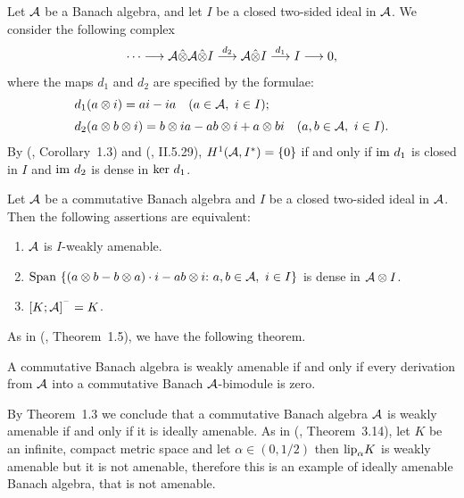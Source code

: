 \documentclass[fleqn]{mat01}
\begin{document}
Let $\cal A$ be a Banach algebra, and let $I$ be a closed two-sided
ideal in $\cal A$. We consider the following complex
\begin{equation*}
\cdots \longrightarrow {\cal A}\hat\otimes{\cal A}\hat\otimes
I\stackrel{d_2 }{\longrightarrow} {\cal A}\hat\otimes I \stackrel
{d_1}{\longrightarrow} I \longrightarrow 0,
\end{equation*}
where the maps $d_1$ and $d_2$ are specified by the formulae:
\begin{align*}
&d_1(a\otimes i)=ai-ia\quad (a\in {\cal A}, \ i\in I);\\[.2pc]
&d_2(a\otimes b\otimes i)=b\otimes ia -ab\otimes i +a\otimes bi \
\ \ (a,b\in {\cal A} , \ i\in I).
\end{align*}
By (\cite{Jo1}, Corollary~1.3) and (\cite{Kh}, II.5.29), $H^1({\cal
A},I^*)=\{0\}$ if and only if ${\rm im}\ d_1$ is closed in $I$ and ${\rm
im}\ d_2$ is dense in ${\rm ker}\ d_1$.

\begin{theor}[\!]
Let $\cal A$ be a commutative Banach algebra and $I$ be a closed
two-sided ideal in $\cal A$. Then the following assertions are
equivalent{\rm :}
\begin{enumerate}
\renewcommand\labelenumi{\rm (\roman{enumi})}
\leftskip .35pc
\item $\cal A$ is $I$-weakly amenable.

\item ${\rm Span}\ \{(a\otimes b-b\otimes a)\cdot i-ab\otimes i{\rm :}\
a,b\in {\cal A},\ i\in I\}$ is dense in ${\cal A}\otimes I$.

\item $[K;{\cal A}]^{^-}=K$.\vspace{-1pc}
\end{enumerate}
\end{theor}

As in (\cite{B-C-D}, Theorem~1.5), we have the following theorem.


\begin{theor}[\!]
A commutative Banach algebra is weakly amenable if and only if every
derivation from $\cal A$ into a commutative Banach $\cal A$-bimodule is
zero.
\end{theor}

By Theorem~1.3 we conclude that a commutative Banach algebra $\cal A$ is
weakly amenable if and only if it is ideally amenable. As in
(\cite{B-C-D}, Theorem~3.14), let $K$ be an infinite, compact metric
space and let $\alpha\in (0,1/2)$ then ${\rm lip}_\alpha K$ is weakly
amenable but it is not amenable, therefore this is an example of ideally
amenable Banach algebra, that is not amenable.
\end{document}
